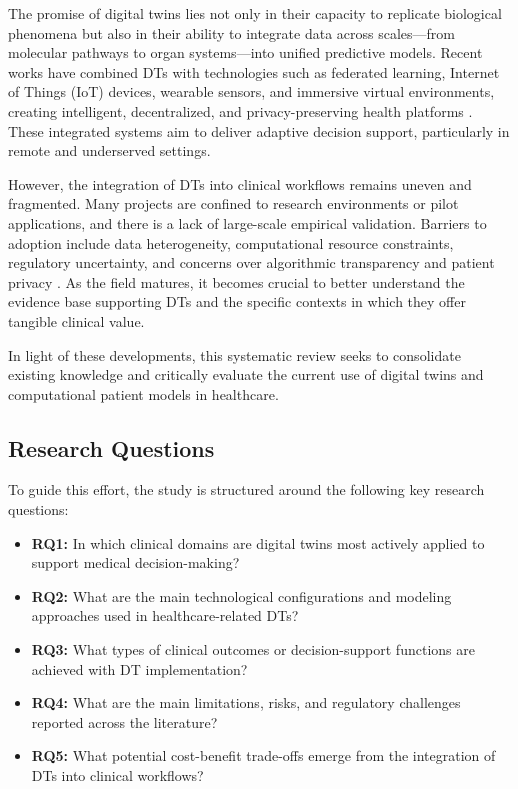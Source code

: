 \documentclass[10pt,a4paper]{article}
\begin{document}
The promise of digital twins lies not only in their capacity to replicate biological phenomena but also in their ability to integrate data across scales—from molecular pathways to organ systems—into unified predictive models. Recent works have combined DTs with technologies such as federated learning, Internet of Things (IoT) devices, wearable sensors, and immersive virtual environments, creating intelligent, decentralized, and privacy-preserving health platforms \cite{Siva Sai2024, Stephanie2024}. These integrated systems aim to deliver adaptive decision support, particularly in remote and underserved settings.

However, the integration of DTs into clinical workflows remains uneven and fragmented. Many projects are confined to research environments or pilot applications, and there is a lack of large-scale empirical validation. Barriers to adoption include data heterogeneity, computational resource constraints, regulatory uncertainty, and concerns over algorithmic transparency and patient privacy \cite{Vidovszky2024, Fekonja2024}. As the field matures, it becomes crucial to better understand the evidence base supporting DTs and the specific contexts in which they offer tangible clinical value.

In light of these developments, this systematic review seeks to consolidate existing knowledge and critically evaluate the current use of digital twins and computational patient models in healthcare.

\subsection*{Research Questions}
To guide this effort, the study is structured around the following key research questions:
\begin{itemize}
    \item \textbf{RQ1:} In which clinical domains are digital twins most actively applied to support medical decision-making?
    \item \textbf{RQ2:} What are the main technological configurations and modeling approaches used in healthcare-related DTs?
    \item \textbf{RQ3:} What types of clinical outcomes or decision-support functions are achieved with DT implementation?
    \item \textbf{RQ4:} What are the main limitations, risks, and regulatory challenges reported across the literature?
    \item \textbf{RQ5:} What potential cost-benefit trade-offs emerge from the integration of DTs into clinical workflows?
\end{itemize}
\end{document}

